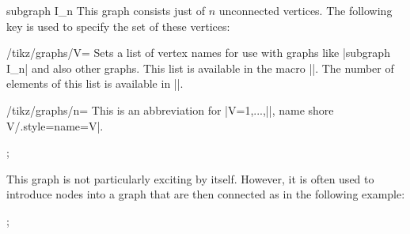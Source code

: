 \begin{graph}{subgraph I\_n}
    This graph consists just of $n$ unconnected vertices. The following key is
    used to specify the set of these vertices:
    \begin{key}{/tikz/graphs/V=}
        Sets a list of vertex names for use with graphs like |subgraph I_n| and
        also other graphs. This list is available in the macro |\tikzgraphV|.
        The number of elements of this list is available in |\tikzgraphVnum|.
    \end{key}
    \begin{key}{/tikz/graphs/n=}
        This is an abbreviation for
        |V={1,...,||}, name shore V/.style={name=V}|.
    \end{key}
\begin{codeexample}[]
\tikz {};
\end{codeexample}
    This graph is not particularly exciting by itself. However, it is often
    used to introduce nodes into a graph that are then connected as in the
    following example:
\begin{codeexample}[]
\tikz {};
\end{codeexample}
\end{graph}

